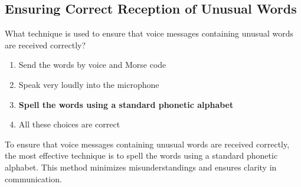 \subsection{Ensuring Correct Reception of Unusual Words}
\label{T2C03}

\begin{tcolorbox}[colback=gray!10!white,colframe=black!75!black,title=T2C03]
What technique is used to ensure that voice messages containing unusual words are received correctly?
\begin{enumerate}[noitemsep]
    \item Send the words by voice and Morse code
    \item Speak very loudly into the microphone
    \item \textbf{Spell the words using a standard phonetic alphabet}
    \item All these choices are correct
\end{enumerate}
\end{tcolorbox}

To ensure that voice messages containing unusual words are received correctly, the most effective technique is to spell the words using a standard phonetic alphabet. This method minimizes misunderstandings and ensures clarity in communication.